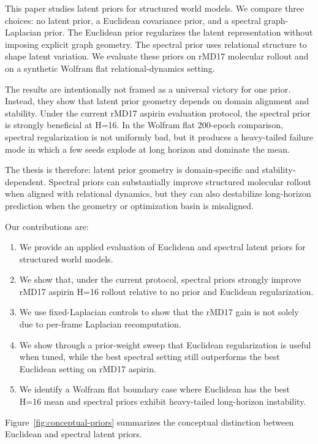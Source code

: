 \documentclass[pdflatex,sn-mathphys-num]{sn-jnl}
\begin{document}
This paper studies latent priors for structured world models. We compare three choices: no latent prior, a Euclidean covariance prior, and a spectral graph-Laplacian prior. The Euclidean prior regularizes the latent representation without imposing explicit graph geometry. The spectral prior uses relational structure to shape latent variation. We evaluate these priors on rMD17 molecular rollout and on a synthetic Wolfram flat relational-dynamics setting.

The results are intentionally not framed as a universal victory for one prior. Instead, they show that latent prior geometry depends on domain alignment and stability. Under the current rMD17 aspirin evaluation protocol, the spectral prior is strongly beneficial at H=16. In the Wolfram flat 200-epoch comparison, spectral regularization is not uniformly bad, but it produces a heavy-tailed failure mode in which a few seeds explode at long horizon and dominate the mean.

The thesis is therefore: latent prior geometry is domain-specific and stability-dependent. Spectral priors can substantially improve structured molecular rollout when aligned with relational dynamics, but they can also destabilize long-horizon prediction when the geometry or optimization basin is misaligned.

Our contributions are:
\begin{enumerate}
    \item We provide an applied evaluation of Euclidean and spectral latent priors for structured world models.
    \item We show that, under the current protocol, spectral priors strongly improve rMD17 aspirin H=16 rollout relative to no prior and Euclidean regularization.
    \item We use fixed-Laplacian controls to show that the rMD17 gain is not solely due to per-frame Laplacian recomputation.
    \item We show through a prior-weight sweep that Euclidean regularization is useful when tuned, while the best spectral setting still outperforms the best Euclidean setting on rMD17 aspirin.
    \item We identify a Wolfram flat boundary case where Euclidean has the best H=16 mean and spectral priors exhibit heavy-tailed long-horizon instability.
\end{enumerate}

Figure~\ref{fig:conceptual-priors} summarizes the conceptual distinction between Euclidean and spectral latent priors.
\end{document}
